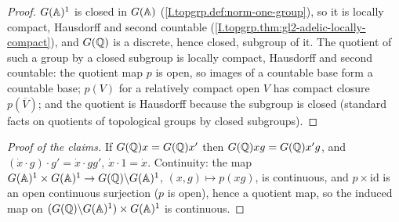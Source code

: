 \begin{theorem}
\end{theorem}
\begin{proof}
$G(\mathbb{A})^1$ is closed in $G(\mathbb{A})$ (\cref{I.topgrp.def:norm-one-group}), so it is locally compact, Hausdorff and second
countable (\cref{I.topgrp.thm:gl2-adelic-locally-compact}), and $G(\mathbb{Q})$ is a discrete, hence closed, subgroup of it. The
quotient of such a group by a closed subgroup is locally compact, Hausdorff and second countable: the quotient map $p$ is
open, so images of a countable base form a countable base; $p(V)$ for a relatively compact open $V$ has compact closure
$p(\overline V)$; and the quotient is Hausdorff because the subgroup is closed (standard facts on quotients of topological groups by closed subgroups).
\end{proof}

\begin{definition}
\end{definition}
\begin{proof}[Proof of the claims]
If $G(\mathbb{Q})x=G(\mathbb{Q})x'$ then $G(\mathbb{Q})xg=G(\mathbb{Q})x'g$, and $(\dot x\cdot g)\cdot g'=\dot x\cdot gg'$, $\dot x\cdot1=\dot x$. Continuity: the map
$G(\mathbb{A})^1\times G(\mathbb{A})^1\to G(\mathbb{Q})\backslash G(\mathbb{A})^1$, $(x,g)\mapsto p(xg)$, is continuous, and $p\times\mathrm{id}$ is an open continuous surjection
($p$ is open), hence a quotient map, so the induced map on $(G(\mathbb{Q})\backslash G(\mathbb{A})^1)\times G(\mathbb{A})^1$ is continuous.
\end{proof}
